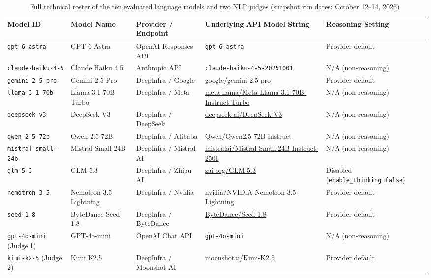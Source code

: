 \begin{table}[t]
\centering
\small
\setlength{\tabcolsep}{2.5pt}
\begin{tabular}{p{3.3cm} p{2.4cm} p{2.4cm} p{5.0cm} p{3.3cm}}
\toprule
\textbf{Model ID} & \textbf{Model Name} & \textbf{Provider / Endpoint} & \textbf{Underlying API Model String} & \textbf{Reasoning Setting} \\
\midrule
\texttt{gpt-6-astra} & GPT-6 Astra & OpenAI Responses API & \texttt{gpt-6-astra} & Provider default \\
\texttt{claude-haiku-4-5} & Claude Haiku 4.5 & Anthropic API & \texttt{claude-haiku-4-5-20251001} & N/A (non-reasoning) \\
\texttt{gemini-2-5-pro} & Gemini 2.5 Pro & DeepInfra / Google & \url{google/gemini-2.5-pro} & Provider default \\
\texttt{llama-3-1-70b} & Llama 3.1 70B Turbo & DeepInfra / Meta & \url{meta-llama/Meta-Llama-3.1-70B-Instruct-Turbo} & N/A (non-reasoning) \\
\texttt{deepseek-v3} & DeepSeek V3 & DeepInfra / DeepSeek & \url{deepseek-ai/DeepSeek-V3} & N/A (non-reasoning) \\
\texttt{qwen-2-5-72b} & Qwen 2.5 72B & DeepInfra / Alibaba & \url{Qwen/Qwen2.5-72B-Instruct} & N/A (non-reasoning) \\
\texttt{mistral-small-24b} & Mistral Small 24B & DeepInfra / Mistral AI & \url{mistralai/Mistral-Small-24B-Instruct-2501} & N/A (non-reasoning) \\
\texttt{glm-5-3} & GLM 5.3 & DeepInfra / Zhipu AI & \url{zai-org/GLM-5.3} & Disabled (\texttt{enable\_thinking}\allowbreak\texttt{=false}) \\
\texttt{nemotron-3-5} & Nemotron 3.5 Lightning & DeepInfra / Nvidia & \url{nvidia/NVIDIA-Nemotron-3.5-Lightning} & Provider default \\
\texttt{seed-1-8} & ByteDance Seed 1.8 & DeepInfra / ByteDance & \url{ByteDance/Seed-1.8} & Provider default \\
\midrule
\texttt{gpt-4o-mini} (Judge 1) & GPT-4o-mini & OpenAI Chat API & \texttt{gpt-4o-mini} & N/A (non-reasoning) \\
\texttt{kimi-k2-5} (Judge 2) & Kimi K2.5 & DeepInfra / Moonshot AI & \url{moonshotai/Kimi-K2.5} & Provider default \\
\bottomrule
\end{tabular}
\caption{Full technical roster of the ten evaluated language models and two NLP judges (snapshot run dates: October 12--14, 2026).}
\label{tab:app_models}
\end{table}

